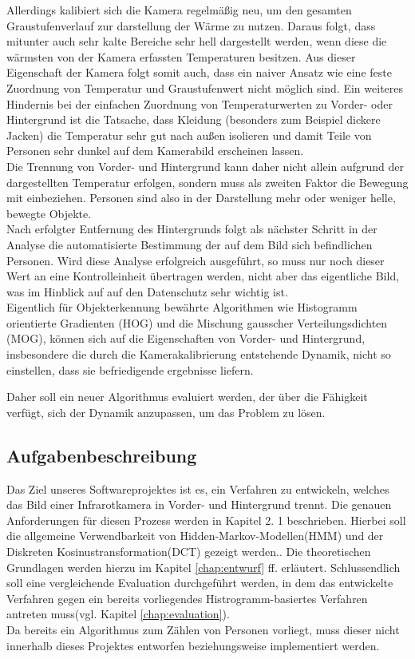 Allerdings kalibiert sich die Kamera regelmäßig neu, um den gesamten Graustufenverlauf zur darstellung der Wärme zu nutzen. Daraus folgt, dass mitunter auch sehr kalte Bereiche sehr hell dargestellt werden, wenn diese die wärmsten von der Kamera erfassten Temperaturen besitzen.
Aus dieser Eigenschaft der Kamera folgt somit auch, dass ein naiver Ansatz wie eine feste Zuordnung von Temperatur und Graustufenwert nicht möglich sind. Ein weiteres Hindernis bei der einfachen Zuordnung von Temperaturwerten zu Vorder- oder Hintergrund ist die Tatsache, dass Kleidung (besonders zum Beispiel dickere Jacken) die Temperatur sehr gut nach außen isolieren und damit Teile von Personen sehr dunkel auf dem Kamerabild erscheinen lassen.\\
Die Trennung von Vorder- und Hintergrund kann daher nicht allein aufgrund der dargestellten Temperatur erfolgen, sondern muss als zweiten Faktor die Bewegung mit einbeziehen.
Personen sind also in der Darstellung mehr oder weniger helle, bewegte Objekte.\\
Nach erfolgter Entfernung des Hintergrunds folgt als nächster Schritt in der Analyse die automatisierte Bestimmung der auf dem Bild sich befindlichen Personen.
Wird diese Analyse erfolgreich ausgeführt, so muss nur noch dieser Wert an eine Kontrolleinheit übertragen werden, nicht aber das eigentliche Bild, was im Hinblick auf auf den Datenschutz sehr wichtig ist.\\
Eigentlich für Objekterkennung bewährte Algorithmen wie Histogramm orientierte Gradienten (HOG)\cite{Dalal05histogramsof} und die Mischung gausscher Verteilungsdichten (MOG)\cite{DBLP:conf/focs/Dasgupta99}, können sich auf die Eigenschaften von Vorder- und Hintergrund, insbesondere die durch die Kamerakalibrierung entstehende Dynamik, nicht so einstellen, dass sie befriedigende ergebnisse liefern.

Daher soll ein neuer Algorithmus evaluiert werden, der über die Fähigkeit verfügt, sich der Dynamik anzupassen, um das Problem zu lösen.\\


\subsection{Aufgabenbeschreibung}
\label{sec:aufgabenbeschreibung}

Das Ziel unseres Softwareprojektes ist es, ein Verfahren zu entwickeln, welches das Bild einer Infrarotkamera in Vorder- und Hintergrund trennt.
 Die genauen Anforderungen für diesen Prozess werden in Kapitel 2.
1 beschrieben.
 Hierbei soll die allgemeine Verwendbarkeit von Hidden-Markov-Modellen(HMM)\cite{Stamp04arevealing} und der Diskreten Kosinustransformation(DCT)\cite{Khayam03thediscrete} gezeigt werden..
 Die theoretischen Grundlagen werden hierzu im Kapitel \ref{chap:entwurf} ff. erläutert.
 Schlussendlich soll eine vergleichende Evaluation durchgeführt werden, in dem das entwickelte Verfahren gegen ein bereits vorliegendes Histrogramm-basiertes Verfahren antreten muss(vgl. Kapitel \ref{chap:evaluation}).\\
Da bereits ein Algorithmus zum Zählen von Personen vorliegt, muss dieser nicht innerhalb dieses Projektes entworfen beziehungsweise implementiert werden.

